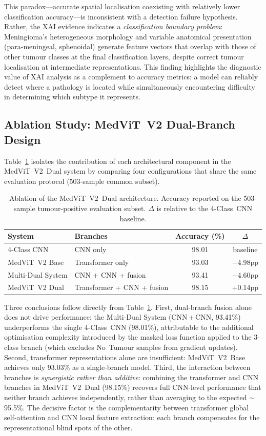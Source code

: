 This paradox---accurate spatial localisation coexisting with
relatively lower classification accuracy---is inconsistent with a detection
failure hypothesis. Rather, the XAI evidence indicates a
\emph{classification boundary problem}: Meningioma's heterogeneous morphology
and variable anatomical presentation (para-meningeal, sphenoidal) generate
feature vectors that overlap with those of other tumour classes at the final
classification layers, despite correct tumour localisation at intermediate
representations. This finding highlights the diagnostic value of XAI analysis
as a complement to accuracy metrics: a model can reliably detect where a
pathology is located while simultaneously encountering difficulty in determining
which subtype it represents.

\subsection{Ablation Study: MedViT~V2 Dual-Branch Design}
\label{subsec:ablation}

Table~\ref{tab:ablation} isolates the contribution of each architectural
component in the MedViT~V2~Dual system by comparing four configurations that
share the same evaluation protocol (503-sample common subset).

\begin{table}[ht]
\centering
\caption{Ablation of the MedViT~V2~Dual architecture. Accuracy reported on
  the 503-sample tumour-positive evaluation subset. $\Delta$ is relative to
  the 4-Class~CNN baseline.}
\label{tab:ablation}
\begin{tabular}{llcc}
\toprule
System & Branches & Accuracy (\%) & $\Delta$ \\
\midrule
4-Class CNN       & CNN only                    & 98.01 & baseline  \\
MedViT~V2 Base    & Transformer only            & 93.03 & $-$4.98pp \\
Multi-Dual System & CNN + CNN + fusion          & 93.41 & $-$4.60pp \\
MedViT~V2 Dual    & Transformer + CNN + fusion  & 98.15 & $+$0.14pp \\
\bottomrule
\end{tabular}
\end{table}

Three conclusions follow directly from Table~\ref{tab:ablation}.
First, dual-branch fusion alone does not drive performance: the Multi-Dual
System (CNN\,+\,CNN, 93.41\%) underperforms the single 4-Class~CNN (98.01\%),
attributable to the additional optimisation complexity introduced by the
masked loss function applied to the 3-class branch (which excludes
No~Tumour samples from gradient updates).
Second, transformer representations alone are insufficient: MedViT~V2~Base
achieves only 93.03\% as a single-branch model.
Third, the interaction between branches is \emph{synergistic rather than
additive}: combining the transformer and CNN branches in MedViT~V2~Dual
(98.15\%) recovers full CNN-level performance that neither branch achieves
independently, rather than averaging to the expected $\sim$95.5\%.
The decisive factor is the complementarity between transformer global
self-attention and CNN local feature extraction: each branch compensates for
the representational blind spots of the other.
